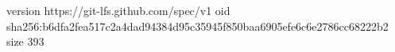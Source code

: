 version https://git-lfs.github.com/spec/v1
oid sha256:b6dfa2fea517c2a4dad94384d95c35945f850baa6905efe6c6e2786cc68222b2
size 393
